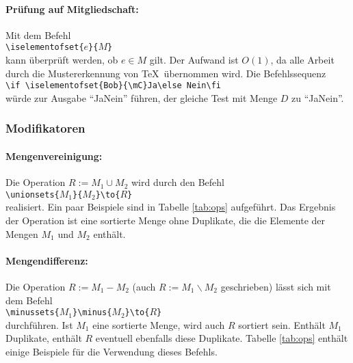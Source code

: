 \paragraph{Prüfung auf Mitgliedschaft:}Mit dem Befehl\\
\mbox{}\hspace{2em}\verb$\iselementofset{$$e$\verb$}{$$M$\verb$}$\\
kann überprüft werden, ob $e \in M$ gilt. Der Aufwand ist $O(1)$, da alle Arbeit durch die Mustererkennung von \TeX\ übernommen wird. Die Befehlssequenz\\
\mbox{}\hspace{2em}\verb$\if \iselementofset{Bob}{\mC}Ja\else Nein\fi$\\
würde zur Ausgabe "`\if {}Ja\else Nein\fi"' führen, der gleiche Test mit Menge $D$ zu "`\if {}Ja\else Nein\fi"'.

\subsubsection{Modifikatoren}\label{modifikatoren}

\paragraph{Mengenvereinigung:}Die Operation $R := M_1 \cup M_2$ wird durch den Befehl\\
\mbox{}\hspace{2em}\verb|\unionsets{|$M_1$\verb|}{|$M_2$\verb|}\to{|$R$\verb|}|\\
realisiert. Ein paar Beispiele sind in Tabelle \ref{tab:ops} aufgeführt. Das Ergebnis der Operation ist eine sortierte Menge ohne Duplikate, die die Elemente der Mengen $M_1$ und $M_2$ enthält.

\paragraph{Mengendifferenz:}Die Operation $R := M_1 - M_2$ (auch $R := M_1 \backslash M_2$ geschrieben) lässt sich mit dem Befehl\\
\mbox{}\hspace{2em}\verb|\minussets{|$M_1$\verb|}\minus{|$M_2$\verb|}\to{|$R$\verb|}|\\
durchführen. Ist $M_1$ eine sortierte Menge, wird auch $R$ sortiert sein. Enthält $M_1$ Duplikate, enthält $R$ eventuell ebenfalls diese Duplikate. Tabelle \ref{tab:ops} enthält einige Beispiele für die Verwendung dieses Befehls.


